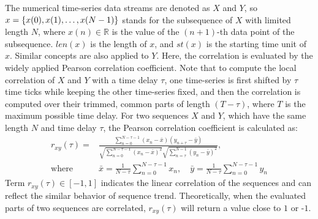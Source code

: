 The numerical time-series data streams are denoted as $X$ and $Y$, so $x = \{x(0), \\x(1), \ldots, x(N- 1)\}$ stands for the subsequence of $X$ with limited length $N$, where $x(n) \in \mathbb{R}$ is the value of the $(n + 1)$-th data point of the subsequence. $len(x)$ is the length of $x$, and $st(x)$ is the starting time unit of $x$. Similar concepts are also applied to $Y$. Here, the correlation is evaluated by the widely applied Pearson correlation coefficient. Note that to compute the local correlation of $X$ and $Y$ with a time delay $\tau$, one time-series is first shifted by $\tau$ time ticks while keeping the other time-series fixed, and then the correlation is computed over their trimmed, common parts of length $(T - \tau)$, where $T$ is the maximum possible time delay. For two sequences $X$ and $Y$, which have the same length $N$ and time delay $\tau$, the Pearson correlation coefficient is calculated as:
\begin{equation}
\label{equ:6}
\begin{aligned}
r_{x y}(\tau)= & \frac{\sum_{n=0}^{N-\tau-1}\left(x_{n}-\bar{x}\right)\left(y_{n+\tau}-\bar{y}\right)}{\sqrt{\sum_{n=0}^{N-\tau-1}\left(x_{n}-\bar{x}\right)^{2}} \sqrt{\sum_{n=\tau}^{N-1}\left(y_{n}-\bar{y}\right)^{2}}}, \\\text{where}\quad&\bar{x}=\frac{1}{N-\tau}\sum_{n=0}^{N-\tau-1}x_{n},\quad\bar{y}=\frac{1}{N-\tau}\sum_{n=0}^{N-\tau-1}y_{n}
\end{aligned}
\end{equation}
Term $r_{x y}(\tau) \in[-1,1]$ indicates the linear correlation of the sequences and can reflect the similar behavior of sequence trend. Theoretically, when the evaluated parts of two sequences are correlated, $r_{x y}(\tau)$ will return a value close to $\mbox{1 or -1}$.

